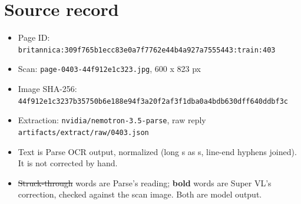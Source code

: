 \documentclass[10pt]{article}
\begin{document}
\section*{Source record}
\begin{itemize}
\item Page ID: \texttt{britannica:309f765b1ecc83e0a7f7762e44b4a927a7555443:train:403}
\item Scan: \texttt{page-0403-44f912e1c323.jpg}, 600 x 823 px
\item Image SHA-256: \texttt{\small 44f912e1c3237b35750b6e188e94f3a20f2af3f1dba0a4bdb630dff640ddbf3c}
\item Extraction: \texttt{nvidia/nemotron-3.5-parse}, raw reply \texttt{artifacts/extract/raw/0403.json}
\item Text is Parse OCR output, normalized (long s as s, line-end hyphens joined). It is not corrected by hand.
\item \sout{Struck-through} words are Parse's reading; \textbf{bold} words are Super VL's correction, checked against the scan image. Both are model output.
\end{itemize}
\end{document}
